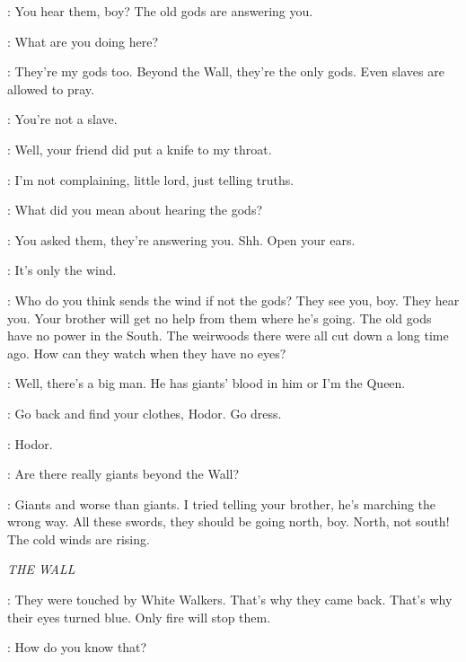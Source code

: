 \OSHA: You hear them, boy? The old gods are answering you. 

\BRAN: What are you doing here? 

\OSHA: They're my gods too. Beyond the Wall, they're the only gods. Even slaves are allowed to pray. 

\BRAN: You're not a slave. 


\BRAN: Well, your friend did put a knife to my throat. 

\OSHA: I'm not complaining, little lord, just telling truths. 

\BRAN: What did you mean about hearing the gods? 

\OSHA: You asked them, they're answering you. Shh. Open your ears. 


\BRAN: It's only the wind. 

\OSHA: Who do you think sends the wind if not the gods? They see you, boy. They hear you. Your brother will get no help from them where he's going. The old gods have no power in the South. The weirwoods there were all cut down a long time ago. How can they watch when they have no eyes? 


\OSHA: Well, there's a big man. He has giants' blood in him or I'm the Queen. 

\BRAN: Go back and find your clothes, Hodor. Go dress. 

\HODOR: Hodor. 

\BRAN: Are there really giants beyond the Wall? 

\OSHA: Giants and worse than giants. I tried telling your brother, he's marching the wrong way. All these swords, they should be going north, boy. North, not south! The cold winds are rising.



\scene

\textit{THE WALL} 


\SAM: They were touched by White Walkers. That's why they came back. That's why their eyes turned blue. Only fire will stop them. 

\JON: How do you know that? 

